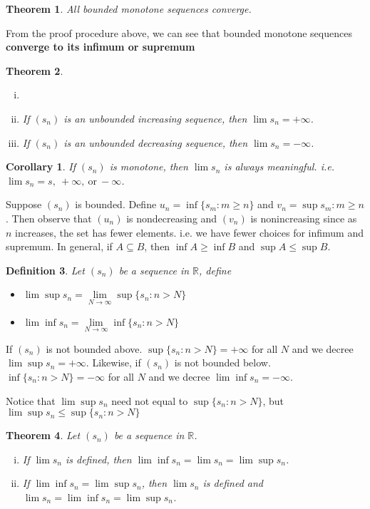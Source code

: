 \documentclass[12pt, lettersize]{book}
\newtheorem{thm}{Theorem}[section]
\newtheorem{dfn}[thm]{Definition}
\newtheorem{cor}{Corollary}[thm]
\begin{document}
	\begin{thm}\label{def:bounded monotone seq}
		All bounded monotone sequences converge.
	\end{thm}
	
	From the proof procedure above, we can see that bounded monotone sequences \textbf{converge to its infimum or supremum}
	
	
	\begin{thm}\label{def:unbounded monotone seq}
		\begin{enumerate}[(i)]
			\item[]
			\item If $(s_n)$ is an unbounded increasing sequence, then $\lim s_n=+\infty$.
			\item If $(s_n)$ is an unbounded decreasing sequence, then $\lim s_n=-\infty$.
		\end{enumerate}
	\end{thm}
	\begin{cor}
		If $(s_n)$ is monotone, then $\lim s_n$ is always meaningful. i.e. $\lim s_n=s,\ +\infty,\ \text{or}\ -\infty$.
	\end{cor}
	
	Suppose $(s_n)$ is bounded. Define $u_n=\inf\{s_m: m\geq n\}$ and $v_n=\sup{s_m: m\geq n}$. Then observe that $(u_n)$ is nondecreasing and $(v_n)$ is nonincreasing since as $n$ increases, the set has fewer elements. i.e. we have fewer choices for infimum and supremum. In general, if $A\subseteq B$, then $\inf A\geq \inf B$ and $\sup A\leq \sup B$.
	
	\begin{dfn}
		Let $(s_n)$ be a sequence in $\mathbb{R}$, define
		\begin{itemize}
			\item $\lim\sup s_n=\lim\limits_{N\rightarrow\infty}\sup\{s_n: n>N\}$
			\item $\lim\inf s_n=\lim\limits_{N\rightarrow\infty}\inf\{s_n: n>N\}$
		\end{itemize}
	\end{dfn}
	If $(s_n)$ is not bounded above. $\sup\{s_n: n>N\}=+\infty$ for all $N$ and we decree $\lim\sup s_n=+\infty$.
	Likewise, if $(s_n)$ is not bounded below. $\inf\{s_n: n>N\}=-\infty$ for all $N$ and we decree $\lim\inf s_n=-\infty$.
	
	Notice that $\lim\sup s_n$ need not equal to $\sup\{s_n: n>N\}$, but $\lim\sup s_n\leq\sup\{s_n: n>N\}$
	
	
	\begin{thm}\label{def:condition for limit}
		Let $(s_n)$ be a sequence in $\mathbb{R}$.
		\begin{enumerate}[(i)]
			\item If $\lim s_n$ is defined, then $\lim\inf s_n=\lim s_n=\lim\sup s_n$.
			\item If $\lim\inf s_n=\lim\sup s_n$, then $\lim s_n$ is defined and $\lim s_n=\lim\inf s_n=\lim\sup s_n$.
		\end{enumerate}
	\end{thm}
	
\end{document}
